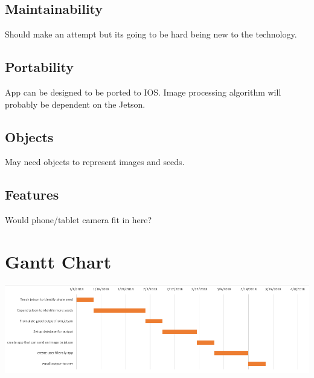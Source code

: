 \documentclass[onecolumn, draftclsnofoot,10pt, compsoc]{IEEEtran}
\begin{document}
\subsection{Maintainability}
Should make an attempt but its going to be hard being new to the technology.

\subsection{Portability}
App can be designed to be ported to IOS.
Image processing algorithm will probably be dependent on the Jetson.

\subsection{Objects}
May need objects to represent images and seeds.

\subsection{Features}
Would phone/tablet camera fit in here?

\section{Gantt Chart}
\includegraphics{gantt_chart.png}
\end{document}
